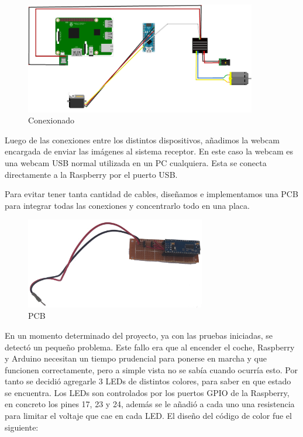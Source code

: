 \documentclass{pclass}
\begin{document}
\begin{itemize}
\begin{figure}[H]
	\centering
	\includegraphics[width=0.9\textwidth]{img/conexionado}
	\caption{Conexionado}
	\label{fig:conexionado}
\end{figure}

Luego de las conexiones entre los distintos dispositivos, añadimos la webcam encargada de enviar las imágenes al sistema receptor. En este caso la webcam es una webcam USB normal utilizada en un PC cualquiera. Esta se conecta directamente a la Raspberry por el puerto USB. 

Para evitar tener tanta cantidad de cables, diseñamos e implementamos una PCB para integrar todas las conexiones y concentrarlo todo en una placa.

\begin{figure}[H]
	\centering
	\includegraphics[width=0.7\textwidth]{img/pcb}
	\caption{PCB}
	\label{fig:pcb}
\end{figure}

En un momento determinado del proyecto, ya con las pruebas iniciadas, se detectó un pequeño problema. Este fallo era que al encender el coche, Raspberry y Arduino necesitan un tiempo prudencial para ponerse en marcha y que funcionen correctamente, pero a simple vista no se sabía cuando ocurría esto. Por tanto se decidió agregarle 3 LEDs de distintos colores, para saber en que estado se encuentra. Los LEDs son controlados por los puertos GPIO de la Raspberry, en concreto los pines 17, 23 y 24, además se le añadió a cada uno una resistencia para limitar el voltaje que cae en cada LED. El diseño del código de color fue el siguiente:


\end{itemize}
\end{document}

